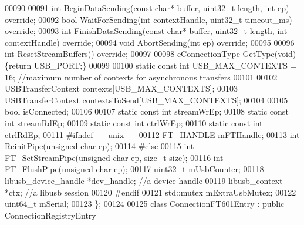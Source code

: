 \begin{DoxyCode}
00090 
00091     \textcolor{keywordtype}{int} BeginDataSending(\textcolor{keyword}{const} \textcolor{keywordtype}{char}* buffer, uint32\_t length, \textcolor{keywordtype}{int} ep) \textcolor{keyword}{override};
00092     \textcolor{keywordtype}{bool} WaitForSending(\textcolor{keywordtype}{int} contextHandle, uint32\_t timeout_ms) \textcolor{keyword}{override};
00093     \textcolor{keywordtype}{int} FinishDataSending(\textcolor{keyword}{const} \textcolor{keywordtype}{char}* buffer, uint32\_t length, \textcolor{keywordtype}{int} contextHandle) \textcolor{keyword}{override};
00094     \textcolor{keywordtype}{void} AbortSending(\textcolor{keywordtype}{int} ep) \textcolor{keyword}{override};
00095     
00096     \textcolor{keywordtype}{int} ResetStreamBuffers() \textcolor{keyword}{override};
00097 
00098     eConnectionType GetType(\textcolor{keywordtype}{void}) \{\textcolor{keywordflow}{return} USB_PORT;\}
00099     
00100     \textcolor{keyword}{static} \textcolor{keyword}{const} \textcolor{keywordtype}{int} USB_MAX_CONTEXTS = 16; \textcolor{comment}{//maximum number of contexts for asynchronous transfers}
00101 
00102     USBTransferContext contexts[USB_MAX_CONTEXTS];
00103     USBTransferContext contextsToSend[USB_MAX_CONTEXTS];
00104 
00105     \textcolor{keywordtype}{bool} isConnected;
00106 
00107     \textcolor{keyword}{static} \textcolor{keyword}{const} \textcolor{keywordtype}{int} streamWrEp;
00108     \textcolor{keyword}{static} \textcolor{keyword}{const} \textcolor{keywordtype}{int} streamRdEp;
00109     \textcolor{keyword}{static} \textcolor{keyword}{const} \textcolor{keywordtype}{int} ctrlWrEp;
00110     \textcolor{keyword}{static} \textcolor{keyword}{const} \textcolor{keywordtype}{int} ctrlRdEp;
00111 \textcolor{preprocessor}{#ifndef \_\_unix\_\_}
00112     FT_HANDLE mFTHandle;
00113     \textcolor{keywordtype}{int} ReinitPipe(\textcolor{keywordtype}{unsigned} \textcolor{keywordtype}{char} ep);
00114 \textcolor{preprocessor}{#else}
00115     \textcolor{keywordtype}{int} FT\_SetStreamPipe(\textcolor{keywordtype}{unsigned} \textcolor{keywordtype}{char} ep, \textcolor{keywordtype}{size\_t} size);
00116     \textcolor{keywordtype}{int} FT\_FlushPipe(\textcolor{keywordtype}{unsigned} \textcolor{keywordtype}{char} ep);
00117     uint32\_t mUsbCounter;
00118     libusb\_device\_handle *dev\_handle; \textcolor{comment}{//a device handle}
00119     libusb\_context *ctx; \textcolor{comment}{//a libusb session}
00120 \textcolor{preprocessor}{#endif}
00121     std::mutex mExtraUsbMutex;
00122     uint64\_t mSerial;
00123 \};
00124 
00125 \textcolor{keyword}{class }ConnectionFT601Entry : \textcolor{keyword}{public} ConnectionRegistryEntry

\end{DoxyCode}
